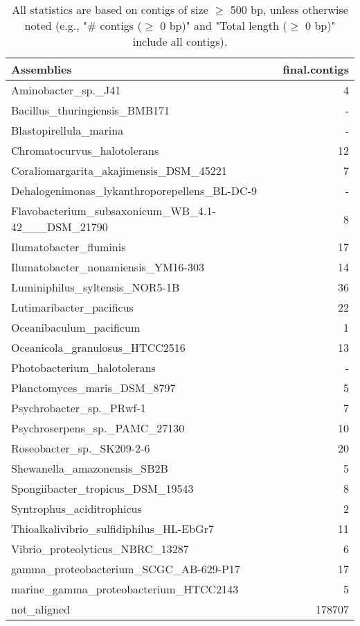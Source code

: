 \documentclass[12pt,a4paper]{article}
\begin{document}
\begin{table}[ht]
\begin{center}
\caption{All statistics are based on contigs of size $\geq$ 500 bp, unless otherwise noted (e.g., "\# contigs ($\geq$ 0 bp)" and "Total length ($\geq$ 0 bp)" include all contigs).}
\begin{tabular}{|l*{1}{|r}|}
\hline
Assemblies & final.contigs \\ \hline
Aminobacter\_sp.\_J41 & 4 \\ \hline
Bacillus\_thuringiensis\_BMB171 & - \\ \hline
Blastopirellula\_marina & - \\ \hline
Chromatocurvus\_halotolerans & 12 \\ \hline
Coraliomargarita\_akajimensis\_DSM\_45221 & 7 \\ \hline
Dehalogenimonas\_lykanthroporepellens\_BL-DC-9 & - \\ \hline
Flavobacterium\_subsaxonicum\_WB\_4.1-42\_\_\_DSM\_21790 & 8 \\ \hline
Ilumatobacter\_fluminis & 17 \\ \hline
Ilumatobacter\_nonamiensis\_YM16-303 & 14 \\ \hline
Luminiphilus\_syltensis\_NOR5-1B & 36 \\ \hline
Lutimaribacter\_pacificus & 22 \\ \hline
Oceanibaculum\_pacificum & 1 \\ \hline
Oceanicola\_granulosus\_HTCC2516 & 13 \\ \hline
Photobacterium\_halotolerans & - \\ \hline
Planctomyces\_maris\_DSM\_8797 & 5 \\ \hline
Psychrobacter\_sp.\_PRwf-1 & 7 \\ \hline
Psychroserpens\_sp.\_PAMC\_27130 & 10 \\ \hline
Roseobacter\_sp.\_SK209-2-6 & 20 \\ \hline
Shewanella\_amazonensis\_SB2B & 5 \\ \hline
Spongiibacter\_tropicus\_DSM\_19543 & 8 \\ \hline
Syntrophus\_aciditrophicus & 2 \\ \hline
Thioalkalivibrio\_sulfidiphilus\_HL-EbGr7 & 11 \\ \hline
Vibrio\_proteolyticus\_NBRC\_13287 & 6 \\ \hline
gamma\_proteobacterium\_SCGC\_AB-629-P17 & 17 \\ \hline
marine\_gamma\_proteobacterium\_HTCC2143 & 5 \\ \hline
not\_aligned & 178707 \\ \hline
\end{tabular}
\end{center}
\end{table}
\end{document}
